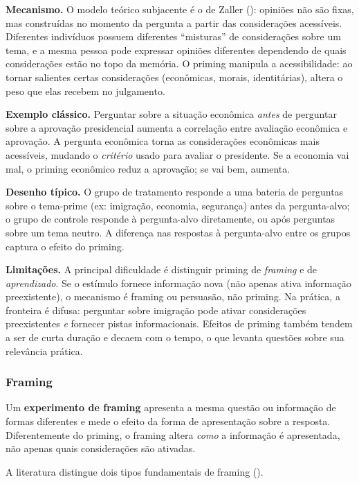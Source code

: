\documentclass[
]{article}
\begin{document}
\textbf{Mecanismo.} O modelo teórico subjacente é o de Zaller (): opiniões não são fixas, mas construídas no momento da pergunta a partir das considerações acessíveis. Diferentes indivíduos possuem diferentes ``misturas'' de considerações sobre um tema, e a mesma pessoa pode expressar opiniões diferentes dependendo de quais considerações estão no topo da memória. O priming manipula a acessibilidade: ao tornar salientes certas considerações (econômicas, morais, identitárias), altera o peso que elas recebem no julgamento.

\textbf{Exemplo clássico.} Perguntar sobre a situação econômica \emph{antes} de perguntar sobre a aprovação presidencial aumenta a correlação entre avaliação econômica e aprovação. A pergunta econômica torna as considerações econômicas mais acessíveis, mudando o \emph{critério} usado para avaliar o presidente. Se a economia vai mal, o priming econômico reduz a aprovação; se vai bem, aumenta.

\textbf{Desenho típico.} O grupo de tratamento responde a uma bateria de perguntas sobre o tema-prime (ex: imigração, economia, segurança) antes da pergunta-alvo; o grupo de controle responde à pergunta-alvo diretamente, ou após perguntas sobre um tema neutro. A diferença nas respostas à pergunta-alvo entre os grupos captura o efeito do priming.

\textbf{Limitações.} A principal dificuldade é distinguir priming de \emph{framing} e de \emph{aprendizado}. Se o estímulo fornece informação nova (não apenas ativa informação preexistente), o mecanismo é framing ou persuasão, não priming. Na prática, a fronteira é difusa: perguntar sobre imigração pode ativar considerações preexistentes \emph{e} fornecer pistas informacionais. Efeitos de priming também tendem a ser de curta duração e decaem com o tempo, o que levanta questões sobre sua relevância prática.

\subsubsection{Framing}\label{framing}

Um \textbf{experimento de framing} apresenta a mesma questão ou informação de formas diferentes e mede o efeito da forma de apresentação sobre a resposta. Diferentemente do priming, o framing altera \emph{como} a informação é apresentada, não apenas quais considerações são ativadas.

A literatura distingue dois tipos fundamentais de framing ().
\end{document}
